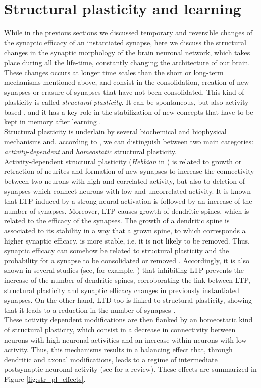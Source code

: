 \documentclass[a4paper, 12pt, twoside, openright]{book}
\begin{document}
\section{Structural plasticity and learning}
\label{sec:str_pl_and_learning}
While in the previous sections we discussed temporary and reversible changes of the synaptic efficacy of an instantiated synapse, here we discuss the structural changes in the synaptic morphology of the brain neuronal network, which takes place during all the life-time, constantly changing the architecture of our brain.\\
These changes occurs at longer time scales than the short or long-term mechanisms mentioned above, and consist in the consolidation, creation of new synapses or erasure of synapses that have not been consolidated. This kind of plasticity is called \textit{structural plasticity}. It can be spontaneous, but also activity-based \cite{Butz2009}, and it has a key role in the stabilization of new concepts that have to be kept in memory after learning \cite{Fu2011}.\\
Structural plasticity is underlain by several biochemical and biophysical mechanisms and, according to \cite{Fauth2016}, we can distinguish between two main categories: \textit{activity-dependent} and \textit{homeostatic} structural plasticity.\\
Activity-dependent structural plasticity (\textit{Hebbian} in \cite{Fauth2016}) is related to growth or retraction of neurites and formation of new synapses to increase the connectivity between two neurons with high and correlated activity, but also to deletion of synapses which connect neurons with low and uncorrelated activity. It is known that LTP induced by a strong neural activation is followed by an increase of the number of synapses. Moreover, LTP causes growth of dendritic spines, which is related to the efficacy of the synapses. The growth of a dendritic spine is associated to its stability in a way that a grown spine, to which corresponds a higher synaptic efficacy, is more stable, i.e. it is not likely to be removed. Thus, synaptic efficacy can somehow be related to structural plasticity and the probability for a synapse to be consolidated or removed \cite{Kasai2003, Hill2013}. Accordingly, it is also shown in several studies (see, for example, \cite{Toni1999}) that inhibiting LTP prevents the increase of the number of dendritic spines, corroborating the link between LTP, structural plasticity and synaptic efficacy changes in previously instantiated synapses. On the other hand, LTD too is linked to structural plasticity, showing that it leads to a reduction in the number of synapses \cite{Wiegert2013}.\\
These activity dependent modifications are then flanked by an homeostatic kind of structural plasticity, which consist in a decrease in connectivity between neurons with high neuronal activities and an increase within neurons with low activity. Thus, this mechanisms results in a balancing effect that, through dendritic and axonal modifications, leads to a regime of intermediate postsynaptic neuronal activity 
(see \cite{Butz2009} for a review). These effects are summarized in Figure \ref{fig:str_pl_effects}.\\
\end{document}
